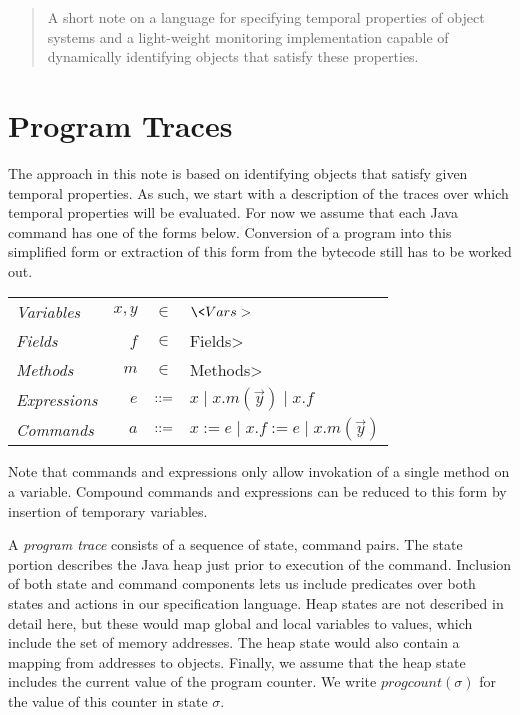 \documentclass{article}
\newcommand{\progcount}{\mathit{progcount}}
\begin{document}
\begin{abstract}
A short note on a language for specifying temporal properties of object systems and a light-weight monitoring implementation capable of dynamically identifying objects that satisfy these properties.  %
\end{abstract}

\section{Program Traces}

The approach in this note is based on identifying objects that satisfy given temporal properties.  As such, we start with a description of the traces over which temporal properties will be evaluated.  For now we assume that each Java command has one of the forms below.  Conversion of a program into this simplified form or extraction of this form from the bytecode still has to be worked out.

\begin{center}
\begin{tabular}{lrcl}
\textit{Variables} & $x,y$ & $\in$ & $\<Vars>$ \\
\textit{Fields} & $f$ & $\in$ & \<Fields> \\
\textit{Methods} & $m$ & $\in$ & \<Methods> \\
\textit{Expressions} & $e$ & $\mathrel{::=}$ & $x \mid x.m(\vec{y}) \mid x.f$ \\
\textit{Commands} & $a$ & $\mathrel{::=}$ & $x := e \mid x.f := e \mid x.m(\vec{y})$ \\
\end{tabular}
\end{center}

Note that commands and expressions only allow invokation of a single method on a variable.  Compound commands and expressions can be reduced to this form by insertion of temporary variables.

A \emph{program trace} consists of a sequence of state, command pairs.  The state portion describes the Java heap just prior to execution of the command.  Inclusion of both state and command components lets us include predicates over both states and actions in our specification language.  Heap states are not described in detail here, but these would map global and local variables to values, which include the set of memory addresses.  The heap state would also contain a mapping from addresses to objects.  Finally, we assume that the heap state includes the current value of the program counter.  We write $\progcount(\sigma)$ for the value of this counter in state $\sigma$.
\end{document}
